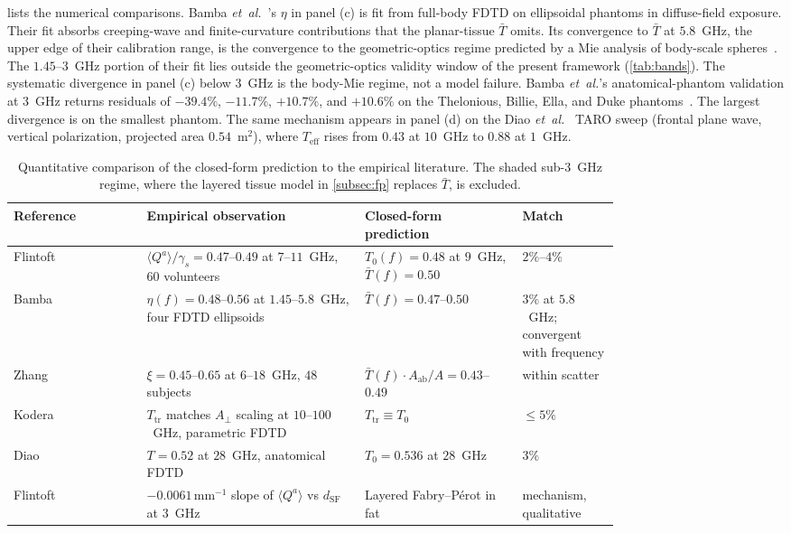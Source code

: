 \documentclass[journal,twocolumn,10pt]{IEEEtran}
\theoremstyle{plain}
\newcommand{\Aab}{A_{\mathrm{ab}}}
\newcommand{\Aperp}{A_\perp}
\newcommand{\Tbar}{\bar{T}}
\begin{document}
 lists the numerical comparisons. Bamba
\textit{et~al.}~\cite{Bamba2014}'s $\eta$ in panel (c) is fit from full-body FDTD on
ellipsoidal phantoms in diffuse-field exposure. Their fit absorbs
creeping-wave and finite-curvature contributions that the
planar-tissue $\Tbar$ omits. Its convergence to $\Tbar$ at
$5.8$~GHz, the upper edge of their calibration range, is the
convergence to the geometric-optics regime predicted by a Mie
analysis of body-scale spheres~\cite{BohrenHuffman1983}. The
$1.45$--$3$~GHz portion of their fit lies outside the
geometric-optics validity window of the present framework
(\cref{tab:bands}). The systematic divergence in panel (c) below
$3$~GHz is the body-Mie regime, not a model failure. Bamba
\textit{et~al.}'s anatomical-phantom validation at $3$~GHz returns
residuals of $-39.4\%$, $-11.7\%$, $+10.7\%$, and $+10.6\%$ on the
Thelonious, Billie, Ella, and Duke phantoms~\cite[Table~7]{Bamba2014}.
The largest divergence is on the smallest phantom. The same
mechanism appears in panel (d) on the Diao \textit{et~al.}~\cite{Diao2024}
TARO sweep (frontal plane wave, vertical polarization, projected area
$0.54$~m$^2$), where $T_{\mathrm{eff}}$ rises from $0.43$ at $10$~GHz
to $0.88$ at $1$~GHz.

\begin{table}[!t]
\centering
\caption{Quantitative comparison of the closed-form prediction to the
empirical literature. The shaded sub-$3$~GHz regime, where the
layered tissue model in \cref{subsec:fp} replaces $\Tbar$, is
excluded.}
\label{tab:waterfall}
\begin{tabular}{lp{0.36\linewidth}p{0.26\linewidth}p{0.16\linewidth}}
\toprule
Reference & Empirical observation & Closed-form prediction & Match \\
\midrule
Flintoft~\cite{Flintoft2014}
& $\langle Q^a\rangle/\gamma_s = 0.47$--$0.49$ at $7$--$11$~GHz, $60$ volunteers
& $T_0(f) = 0.48$ at $9$~GHz, $\Tbar(f) = 0.50$
& $2\%$--$4\%$ \\
Bamba~\cite{Bamba2014}
& $\eta(f) = 0.48$--$0.56$ at $1.45$--$5.8$~GHz, four FDTD ellipsoids
& $\Tbar(f) = 0.47$--$0.50$
& $3\%$ at $5.8$~GHz; convergent with frequency \\
Zhang~\cite{Zhang2017thesis}
& $\xi = 0.45$--$0.65$ at $6$--$18$~GHz, $48$ subjects
& $\Tbar(f)\cdot\Aab/A = 0.43$--$0.49$
& within scatter \\
Kodera~\cite{Kodera2024}
& $T_{\mathrm{tr}}$ matches $\Aperp$ scaling at $10$--$100$~GHz, parametric FDTD
& $T_{\mathrm{tr}} \equiv T_0$
& $\le 5\%$ \\
Diao~\cite{Diao2024}
& $T = 0.52$ at $28$~GHz, anatomical FDTD
& $T_0 = 0.536$ at $28$~GHz
& $3\%$ \\
Flintoft~\cite{Flintoft2014}
& $-0.0061\,\mathrm{mm}^{-1}$ slope of $\langle Q^a\rangle$ vs $d_{\mathrm{SF}}$ at $3$~GHz
& Layered Fabry--P\'erot in fat
& mechanism, qualitative \\
\bottomrule
\end{tabular}
\end{table}
\end{document}
